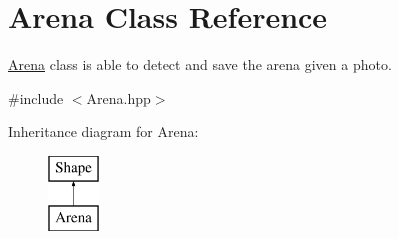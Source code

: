 \hypertarget{class_arena}{}\section{Arena Class Reference}
\label{class_arena}


\mbox{\hyperlink{class_arena}{Arena}} class is able to detect and save the arena given a photo.  




{\ttfamily \#include $<$Arena.\+hpp$>$}

Inheritance diagram for Arena\+:\begin{figure}[H]
\begin{center}
\leavevmode
\includegraphics[height=2.000000cm]{class_arena}
\end{center}
\end{figure}
